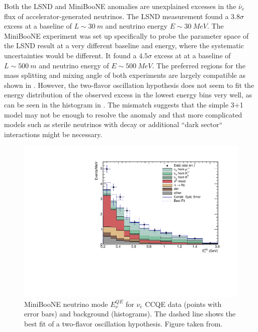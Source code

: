Both the LSND and MiniBooNE anomalies are unexplained excesses in the $\bar{\nu}_e$ flux of accelerator-generated neutrinos. The LSND measurement found a $3.8\sigma$ excess at a baseline of  $L\sim\SI{30}{m}$ and neutrino energy $E\sim\SI{30}{MeV}$\cite{LSND:2001aii}. The MiniBooNE experiment was set up specifically to probe the parameter space of the LSND result at a very different baseline and energy, where the systematic uncertainties would be different. It found a $4.5\sigma$ excess at \cite{MiniBooNE:2018esg} at a baseline of $L\sim\SI{500}{m}$ and neutrino energy of $E\sim\SI{500}{MeV}$. The preferred regions for the mass splitting and mixing angle of both experiments are largely compatible as shown in . However, the two-flavor oscillation hypothesis does not seem to fit the energy distribution of the observed excess in the lowest energy bins very well, as can be seen in the histogram in . The mismatch suggests that the simple 3+1 model may not be enough to resolve the anomaly and that more complicated models such as sterile neutrinos with decay\cite{Fischer_2020} or additional ``dark sector`` interactions\cite{PhysRevLett.121.241801} might be necessary.
\begin{figure}
    \centering
    \includegraphics[width=0.8\linewidth]{figures/theory/histNu_stacked_wbf.pdf}
    \caption{MiniBooNE neutrino mode $E^{QE}_\nu$ for $\nu_e$ CCQE data (points with error bars) and background (histograms). The dashed line shows the best fit of a two-flavor oscillation hypothesis. Figure taken from\cite{MiniBooNE:2018esg}.\label{fig:miniboone-excess-hist}}
\end{figure}
